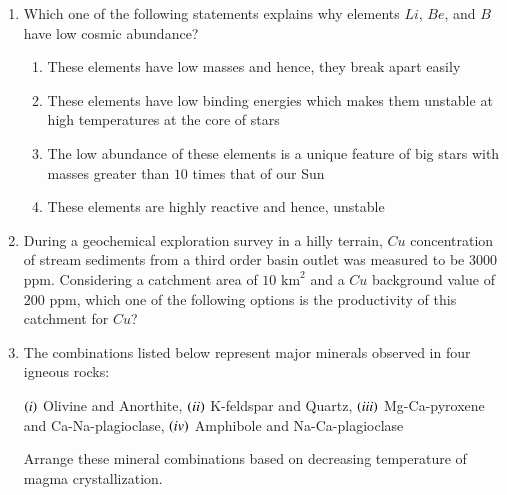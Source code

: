 \documentclass[journal,12pt,onecolumn]{IEEEtran}
\theoremstyle{remark}
\begin{document}
\begin{enumerate}
\item Which one of the following statements explains why elements $Li$, $Be$, and $B$ have low cosmic abundance? \hfill{}
\begin{enumerate}
    \item These elements have low masses and hence, they break apart easily
    \item These elements have low binding energies which makes them unstable at high temperatures at the core of stars
    \item The low abundance of these elements is a unique feature of big stars with masses greater than $10$ times that of our Sun
    \item These elements are highly reactive and hence, unstable
\end{enumerate}

\item During a geochemical exploration survey in a hilly terrain, $Cu$ concentration of stream sediments from a third order basin outlet was measured to be $3000$ ppm. Considering a catchment area of $10 \text{ km}^2$ and a $Cu$ background value of $200$ ppm, which one of the following options is the productivity of this catchment for $Cu$? \hfill{}
\begin{enumerate}
\end{enumerate}

\item The combinations listed below represent major minerals observed in four igneous rocks: 

$\left(i\right)$ Olivine and Anorthite, $\left(ii\right)$ K-feldspar and Quartz, $\left(iii\right)$ Mg-Ca-pyroxene and Ca-Na-plagioclase, $\left(iv\right)$ Amphibole and Na-Ca-plagioclase 

Arrange these mineral combinations based on decreasing temperature of magma crystallization. \hfill{}

\begin{enumerate}
\end{enumerate}


\end{enumerate}
\end{document}
